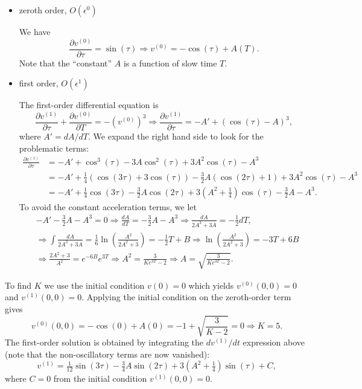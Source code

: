 \documentclass[12pt]{article}
\begin{document}
\begin{ex}
\begin{solution}
  \begin{itemize}
  \item zeroth order, $O(\epsilon^0)$

    We have
    $$\frac{\partial v^{(0)}}{\partial\tau}=\sin(\tau)\Rightarrow v^{(0)}=-\cos(\tau)+A(T).$$
    Note that the ``constant'' $A$ is a function of slow time $T$.
  \item first order, $O(\epsilon^1)$

    The first-order differential equation is
    $$\frac{\partial v^{(1)}}{\partial\tau}+\frac{\partial v^{(0)}}{\partial T}=-\left(v^{(0)}\right)^3\Rightarrow\frac{\partial v^{(1)}}{\partial\tau}=-A'+(\cos(\tau)-A)^3,$$
    where $A'=dA/dT$. We expand the right hand side to look for the problematic terms:
    \begin{align*}
      \frac{\partial v^{(1)}}{\partial\tau}&=-A'+\cos^3(\tau)-3A\cos^2(\tau)+3A^2\cos(\tau)-A^3\\
      &=-A'+\tfrac{1}{4}(\cos(3\tau)+3\cos(\tau))-\tfrac{3}{2}A(\cos(2\tau)+1)+3A^2\cos(\tau)-A^3\\
      &=-A'+\tfrac{1}{4}\cos(3\tau)-\tfrac{3}{2}A\cos(2\tau)+3\left(A^2+\tfrac{1}{4}\right)\cos(\tau)-\tfrac{3}{2}A-A^3.
    \end{align*}
    To avoid the constant acceleration terms, we let
    \begin{align*}
      &-A'-\tfrac{3}{2}A-A^3=0\Rightarrow \frac{dA}{dT}=-\tfrac{3}{2}A-A^3\Rightarrow \frac{dA}{2A^3+3A}=-\tfrac{1}{2}dT,\\
      &\Rightarrow \int{\frac{dA}{2A^3+3A}}=\tfrac{1}{6}\ln\left(\frac{A^2}{2A^2+3}\right)=-\tfrac{1}{2}T+B\Rightarrow \ln\left(\frac{A^2}{2A^2+3}\right)=-3T+6B\\
      &\Rightarrow \frac{2A^2+3}{A^2}=e^{-6B}e^{3T}\Rightarrow A^2=\frac{3}{Ke^{3T}-2}\Rightarrow A=\sqrt{\frac{3}{Ke^{3T}-2}}.
    \end{align*}
  \end{itemize}
    To find $K$ we use the initial condition $v(0)=0$ which yields $v^{(0)}(0,0)=0$ and $v^{(1)}(0,0)=0$. Applying the initial condition on the zeroth-order term gives
    $$v^{(0)}(0,0)=-\cos(0)+A(0)=-1+\sqrt{\frac{3}{K-2}}=0\Rightarrow K=5.$$
    The first-order solution is obtained by integrating the $dv^{(1)}/dt$ expression above (note that the non-oscillatory terms are now vanished):
    $$v^{(1)}=\tfrac{1}{12}\sin(3\tau)-\tfrac{3}{4}A\sin(2\tau)+3\left(A^2+\tfrac{1}{4}\right)\sin(\tau)+C,$$
    where $C=0$ from the initial condition $v^{(1)}(0,0)=0$.


\end{solution}
\end{ex}
\end{document}
